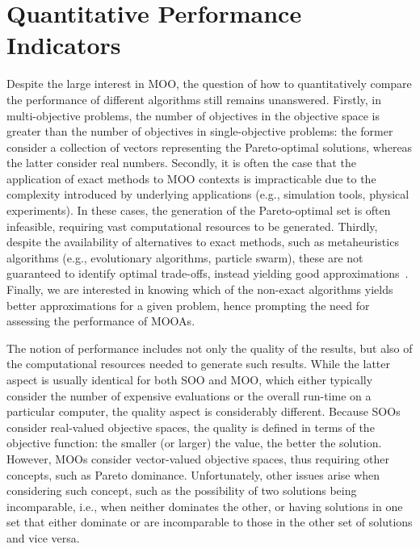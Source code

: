 \section{Quantitative Performance Indicators}

Despite the large interest in \ac{MOO}, the question of how to quantitatively compare the performance of different algorithms still remains unanswered. Firstly, in multi-objective problems, the number of objectives in the objective space is greater than the number of objectives in single-objective problems: the former consider a collection of vectors representing the Pareto-optimal solutions, whereas the latter consider real numbers. Secondly, it is often the case that the application of exact methods to \ac{MOO} contexts is impracticable due to the complexity introduced by underlying applications (e.g., simulation tools, physical experiments). In these cases, the generation of the Pareto-optimal set is often infeasible, requiring vast computational resources to be generated. Thirdly, despite the availability of alternatives to exact methods, such as metaheuristics algorithms (e.g., evolutionary algorithms, particle swarm), these are not guaranteed to identify optimal trade-offs, instead yielding good approximations~\cite{Zitzler2003Metrics}. Finally, we are interested in knowing which of the non-exact algorithms yields better approximations for a given problem, hence prompting the need for assessing the performance of \acp{MOOA}.

The notion of performance includes not only the quality of the results, but also of the computational resources needed to generate such results. While the latter aspect is usually identical for both \ac{SOO} and \ac{MOO}, which either typically consider the number of expensive evaluations or the overall run-time on a particular computer, the quality aspect is considerably different. Because \acp{SOO} consider real-valued objective spaces, the quality is defined in terms of the objective function: the smaller (or larger) the value, the better the solution. However, \acp{MOO} consider vector-valued objective spaces, thus requiring other concepts, such as Pareto dominance. Unfortunately, other issues arise when considering such concept, such as the possibility of two solutions being incomparable, i.e., when neither dominates the other, or having solutions in one set that either dominate or are incomparable to those in the other set of solutions and vice versa. 

